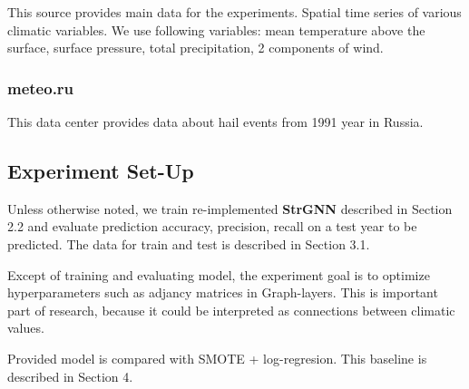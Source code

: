\documentclass{article}
\begin{document}
This source provides main data for the experiments. Spatial time series of various 
climatic variables. We use following variables: mean temperature above the surface, surface pressure, total precipitation, 2 components of wind.
\subsubsection{meteo.ru}
This data center provides data about hail events from 1991 year in Russia.
\subsection{Experiment Set-Up}
Unless otherwise noted, we train re-implemented \textbf{StrGNN} described in Section 2.2 and evaluate prediction accuracy, precision, recall on a test year to be predicted. The data for train and test is described in Section 3.1.

Except of training and evaluating model, the experiment goal is to optimize hyperparameters such as adjancy matrices in Graph-layers. This is important part of research, because it could be interpreted as connections between climatic values. 

Provided model is compared with SMOTE + log-regresion. This baseline is described in Section 4.
\end{document}
